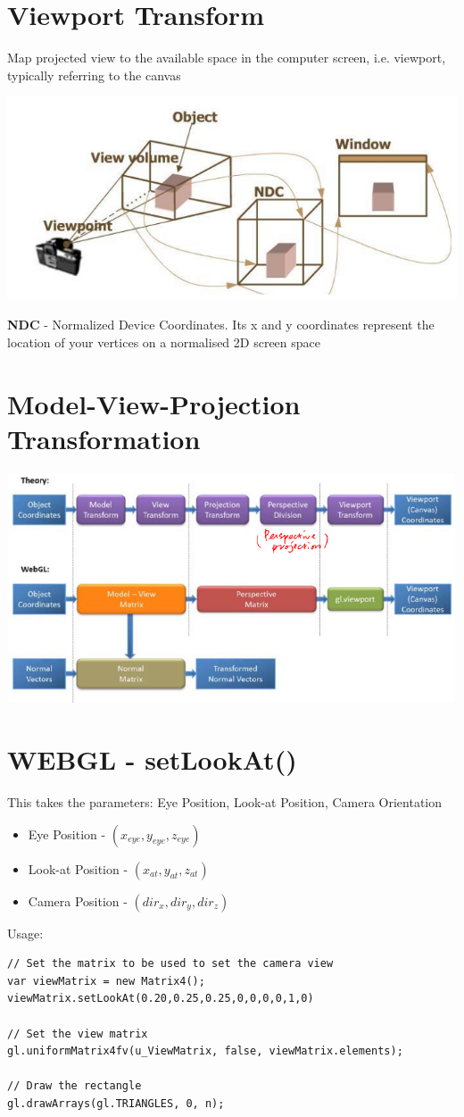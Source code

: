 \documentclass{article}[18pt]
\begin{document}
\section{Viewport Transform}
Map projected view to the available space in the computer screen, i.e. viewport, typically referring to the canvas
\begin{center}
	\includegraphics[scale=0.7]{"Viewport Transform"}
\end{center}
\textbf{NDC} - Normalized Device Coordinates. Its x and y coordinates represent the location of your vertices on a normalised 2D screen space
\section{Model-View-Projection Transformation}
\begin{center}
	\includegraphics[scale=0.7]{"Model-View-Projection Transformation"}
\end{center}
\section{WEBGL - setLookAt()}
This takes the parameters: Eye Position, Look-at Position, Camera Orientation
\begin{itemize}
	\item Eye Position - $(x_{eye},y_{eye},z_{eye})$
	\item Look-at Position - $(x_{at},y_{at},z_{at})$
	\item Camera Position - $(dir_{x},dir_{y},dir_{z})$
\end{itemize}
Usage:
\begin{verbatim}
// Set the matrix to be used to set the camera view
var viewMatrix = new Matrix4();
viewMatrix.setLookAt(0.20,0.25,0.25,0,0,0,0,1,0)

// Set the view matrix
gl.uniformMatrix4fv(u_ViewMatrix, false, viewMatrix.elements);

// Draw the rectangle
gl.drawArrays(gl.TRIANGLES, 0, n);
\end{verbatim}
\end{document}
